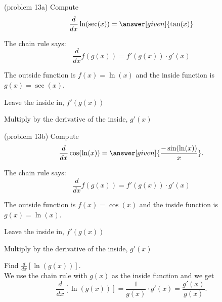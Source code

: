 \documentclass{ximera}
\begin{document}
\begin{center}
\begin{foldable}
\end{foldable}
\end{center}


\begin{problem}(problem 13a)
  Compute
  \[
  \frac{d}{dx} \ln(\sec(x)) = \answer[given]{\tan(x)}
  \]
  
    \begin{hint}
      The chain rule says:
      \[
      \frac{d}{dx} f(g(x)) = f'(g(x))\cdot g'(x)
      \]
    \end{hint}
    \begin{hint}
      The outside function is $f(x) = \ln(x)$ and the inside
      function is $g(x) = \sec(x)$.
    \end{hint}
    \begin{hint}
		  Leave the inside in, $f'(g(x))$
		\end{hint}
		\begin{hint}
		  Multiply by the derivative of the inside, $g'(x)$
		\end{hint}
    
	
\end{problem}

\begin{problem}(problem 13b)
  Compute
  \[
  \frac{d}{dx} \cos(\ln(x)) = \answer[given]{\frac{-\sin(\ln(x))}{x}}.
  \]
  
    \begin{hint}
      The chain rule says:
      \[
      \frac{d}{dx} f(g(x)) = f'(g(x))\cdot g'(x)
      \]
    \end{hint}
    \begin{hint}
      The outside function is $f(x) = \cos(x)$ and the inside
      function is $g(x) = \ln(x)$.
    \end{hint}
    \begin{hint}
		  Leave the inside in, $f'(g(x))$
		\end{hint}
		\begin{hint}
		  Multiply by the derivative of the inside, $g'(x)$
		\end{hint}
    
		
\end{problem}

\begin{example}[example 14]
Find $\frac{d}{dx} \left[\ln(g(x))\right]$.\\
We use the chain rule with $g(x)$ as the inside function and we get
\[
\frac{d}{dx} \left[\ln(g(x))\right] = \frac{1}{g(x)}\cdot g'(x) = \frac{g'(x)}{g(x)}.
\]
\end{example}
\end{document}
